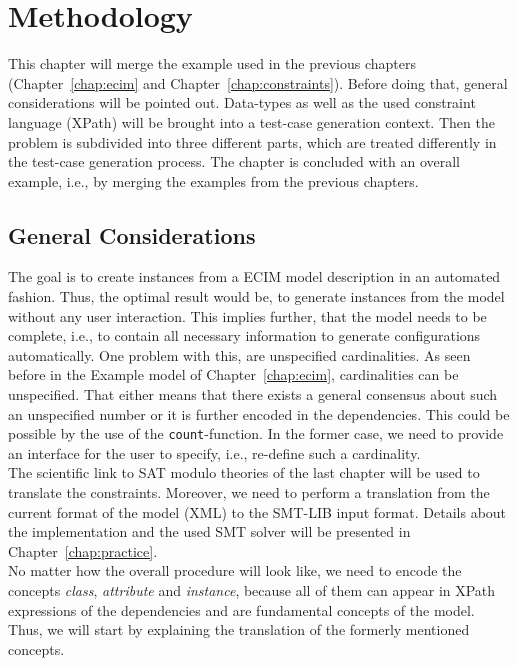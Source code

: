 \chapter{Methodology}\label{chap:methodology}

This chapter will merge the example used in the previous chapters (Chapter~\ref{chap:ecim} and Chapter~\ref{chap:constraints}). Before doing that, general considerations will be pointed out. Data-types as well as the used constraint language (XPath) will be brought into a test-case generation context. Then the problem is subdivided into three different parts, which are treated differently in the test-case generation process. The chapter is concluded with an overall example, i.e., by merging the examples from the previous chapters.

\section{General Considerations}\label{sec:general}

The goal is to create instances from a ECIM model description in an automated fashion. Thus, the optimal result would be, to generate instances from the model without any user interaction. This implies further, that the model needs to be complete, i.e., to contain all necessary information to generate configurations automatically. One problem with this, are unspecified cardinalities. As seen before in the Example model of Chapter~\ref{chap:ecim}, cardinalities can be unspecified. That either means that there exists a general consensus about such an unspecified number or it is further encoded in the dependencies. This could be possible by the use of the \verb|count|-function. In the former case, we need to provide an interface for the user to specify, i.e., re-define such a cardinality. \\

The scientific link to SAT modulo theories of the last chapter will be used to translate the constraints. Moreover, we need to perform a translation from the current format of the model (XML) to the SMT-LIB input format. Details about the implementation and the used SMT solver will be presented in Chapter~\ref{chap:practice}.\\

No matter how the overall procedure will look like, we need to encode the concepts \emph{class}, \emph{attribute} and \emph{instance}, because all of them can appear in XPath expressions of the dependencies and are fundamental concepts of the model. Thus, we will start by explaining the translation of the formerly mentioned concepts.

